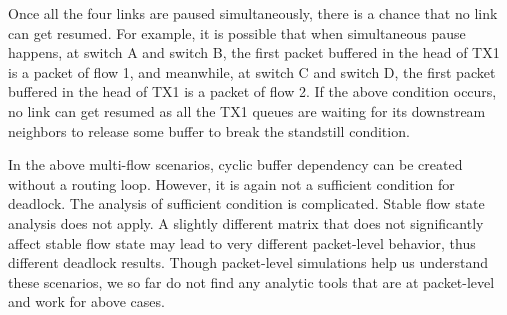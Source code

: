 Once all the four links are paused simultaneously, there is a chance that no link can get resumed. 
For example, it is possible that when simultaneous pause happens, at switch A and switch B, the 
first packet buffered in the head of TX1 is a packet of flow 1, and meanwhile, at switch C and switch 
D, the first packet buffered in the head of TX1 is a packet of flow 2. If the above condition occurs, 
no link can get resumed as all the TX1 queues are waiting for its downstream neighbors to release some 
buffer to break the standstill condition.

In the above multi-flow scenarios, cyclic buffer dependency can be created without 
a routing loop. However, it is again not a sufficient condition for deadlock. The analysis of sufficient
condition is complicated. Stable flow state analysis does not apply.
A slightly different matrix that does not significantly affect stable flow state may lead
to very different packet-level behavior, thus different deadlock results. 
Though packet-level simulations help us understand these scenarios, we so far do not find
any analytic tools that are at packet-level and work for above cases.


